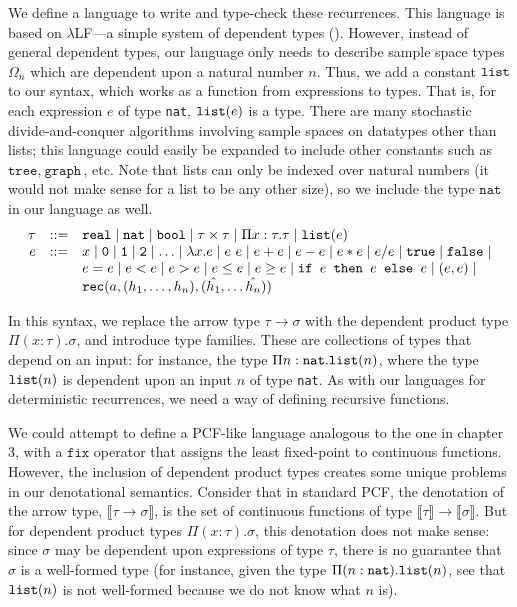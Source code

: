 We define a language to write and type-check these recurrences. This language is based on $\lambda$LF---a simple system of 
dependent types (\cite{Pierce:2005aa}). However, instead of general dependent types, our language only needs to
describe sample space types $\Omega_n$ which are dependent upon a natural number $n$. Thus, we add
a constant $\texttt{list}$ to our syntax, which works as a function from expressions to types. That is, for each 
expression $e$ of type \texttt{nat}, $\texttt{list}(e)$ is a type. There are many stochastic divide-and-conquer algorithms involving sample spaces
on datatypes other than lists; this language could easily be expanded to include other constants such as
 $\texttt{tree}, \ \texttt{graph}$, etc. Note that lists can only be indexed over natural numbers (it would not make 
 sense for a list to be any other size), so we include the type $\texttt{nat}$ in our language as well.
 \[
\begin{array}{rcl}
\tau &::=& \texttt{real} \mid \texttt{nat} \mid \texttt{bool} \mid \tau \times \tau \mid \Pi x:\tau.\tau
\mid \texttt{list}(e) \\
e &::=& x  \mid \texttt{0} \mid \texttt{1} \mid \texttt{2} \mid \dotsc \mid \lambda x.e \mid e \ e \mid e + e \mid e - e \mid  e  *  e \mid e / e \mid \texttt{true} \mid \texttt{false} \mid \\
  && e  =  e \mid e < e \mid e > e \mid e \leq e \mid e \geq e \mid 
     \texttt{if } e \texttt{ then } e \texttt{ else } e \mid (e,e) \mid \\
     && \texttt{rec}(a, (h_1, \ldots, h_n), (\hat{h_1}, \ldots \hat{h_n})) 
\end{array}
\]

In this syntax, we replace the arrow type $\tau \rightarrow \sigma$ with the dependent product type
$\Pi (x:\tau).\sigma$, and introduce type families. 
These are collections of types that depend on an input: for instance,
the type $\Pi n:\texttt{nat}.\texttt{list}(n)$, where the type $\texttt{list}(n)$ is dependent upon an input $n$ of type \texttt{nat}.
As with our languages for deterministic recurrences, we need a way of defining recursive functions. 

We could attempt
to define a PCF-like language analogous to the one in chapter 3, with a $\texttt{fix}$ operator that assigns the least
fixed-point to continuous functions. However, the inclusion of dependent product types creates some unique problems
in our denotational semantics. Consider that in standard PCF, the denotation of the arrow type, $\llbracket \tau \rightarrow \sigma \rrbracket$, is the
set of continuous functions of type
$\llbracket \tau \rrbracket \rightarrow \llbracket \sigma \rrbracket$. But for dependent product types $\Pi(x:\tau).\sigma$,
this denotation does not make sense: 
since $\sigma$ may be dependent upon expressions of type $\tau$, there is no guarantee
that $\sigma$ is a well-formed type (for instance, given the type $\Pi(n:\texttt{nat}).\texttt{list}(n)$, see that
$ \texttt{list}(n)$ is not well-formed because we do not know what $n$ is).

